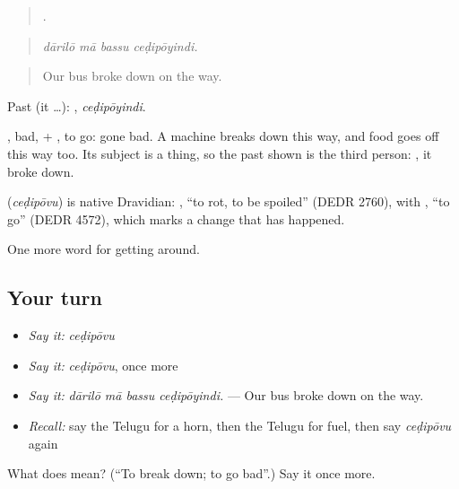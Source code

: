 \begin{quote}
   .
\end{quote}

\begin{quote}
\emph{dārilō mā bassu ceḍipōyindi.}
\end{quote}

\begin{quote}
Our bus broke down on the way.
\end{quote}

Past (it …): , \emph{ceḍipōyindi}.

, bad, + , to go: gone bad. A machine breaks down this way, and food goes off this way too. Its subject is a thing, so the past shown is the third person: , it broke down.

\begin{cousinweb}
\textbf{} (\emph{ceḍipōvu}) is native Dravidian: , \textquotedblleft{}to rot, to be spoiled\textquotedblright{} (DEDR 2760), with , \textquotedblleft{}to go\textquotedblright{} (DEDR 4572), which marks a change that has happened.
\end{cousinweb}

\begin{grammarlens}[title={What you've built}]
One more word for getting around.
\end{grammarlens}

\subsection*{Your turn}
\begin{itemize}
\raggedright
  \item \emph{Say it:} \emph{ceḍipōvu}
  \item \emph{Say it:} \emph{ceḍipōvu}, once more
  \item \emph{Say it:} \emph{dārilō mā bassu ceḍipōyindi.} — Our bus broke down on the way.
  \item \emph{Recall:} say the Telugu for a horn, then the Telugu for fuel, then say \emph{ceḍipōvu} again
\end{itemize}

\begin{tcolorbox}[breakable,colback=teal!4,colframe=teal!35!black,title={Before you move on}]
What does  mean? (\textquotedblleft{}To break down; to go bad\textquotedblright{}.) Say it once more.
\end{tcolorbox}
